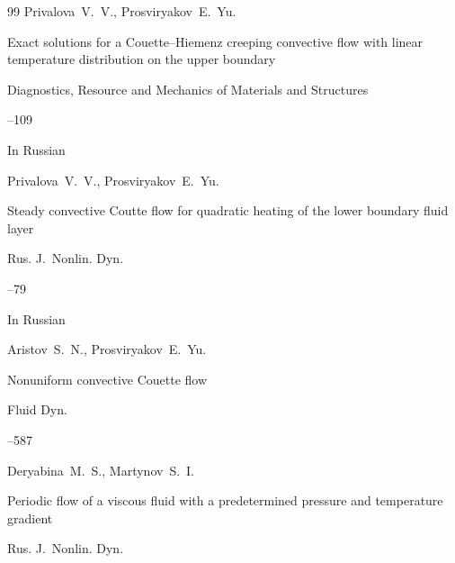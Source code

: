 \begin{thebibliography}{99}
\by Privalova~V.~V., Prosviryakov~E.~Yu.

\paper Exact solutions for a Couette--Hiemenz creeping convective flow with linear temperature distribution on the upper boundary

\jour Diagnostics, Resource and Mechanics of Materials and Structures



--109 

\lang In Russian





\by Privalova~V.~V., Prosviryakov~E.~Yu.

\paper Steady convective Coutte flow for quadratic heating of the lower boundary fluid layer

\jour Rus. J.~Nonlin. Dyn.




--79 

\lang In Russian





\by Aristov~S.~N., Prosviryakov~E.~Yu.

\paper Nonuniform convective Couette flow

\jour Fluid Dyn.




--587






\by Deryabina~M.~S.,  Martynov~S.~I.

\paper Periodic flow of a viscous fluid with a predetermined pressure and temperature gradient

\jour Rus. J.~Nonlin. Dyn.





\end{thebibliography}
